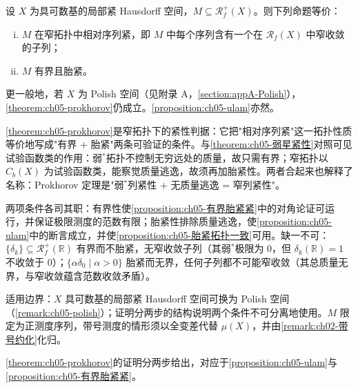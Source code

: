 \documentclass[../../main.tex]{subfiles}%
\begin{document}
\begin{theorem}[Prokhorov]\label{theorem:ch05-prokhorov}
设 $X$ 为具可数基的局部紧 Hausdorff 空间，$M\subseteq\mathscr{R}^+_f(X)$。则下列命题等价：
\begin{enumerate}[(i)]
\item\label{item:ch05-prokth-i} $M$ 在窄拓扑中相对序列紧，即 $M$ 中每个序列含有一个在 $\mathscr{R}_f(X)$ 中窄收敛的子列；
\item\label{item:ch05-prokth-ii} $M$ 有界且胎紧。
\end{enumerate}
\end{theorem}

\begin{remark}\label{remark:ch05-polish}
更一般地，若 $X$ 为 Polish 空间（见附录 A，\cref{section:appA-Polish}），\cref{theorem:ch05-prokhorov}仍成立。\cref{proposition:ch05-ulam}亦然。
\end{remark}

\begin{remark}\label{remark:ch05-prokhorov动机}
\cref{theorem:ch05-prokhorov}是窄拓扑下的紧性判据：它把"相对序列紧"这一拓扑性质等价地写成"有界 + 胎紧"两条可验证的条件。与\cref{theorem:ch05-弱星紧性}对照可见试验函数类的作用：弱$^*$拓扑不控制无穷远处的质量，故只需有界；窄拓扑以 $C_b(X)$ 为试验函数类，能察觉质量逃逸，故须再加胎紧性。两者合起来也解释了名称：Prokhorov 定理是"弱$^*$列紧性 + 无质量逃逸 = 窄列紧性"。

两项条件各司其职：有界性使\cref{proposition:ch05-有界胎紧紧}中的对角论证可运行，并保证极限测度的范数有限；胎紧性排除质量逃逸，使\cref{proposition:ch05-ulam}中的断言成立，并使\cref{proposition:ch05-胎紧拓扑一致}可用。缺一不可：$\{\delta_k\}\subseteq\mathscr{R}^+_f(\mathbb{R})$ 有界而不胎紧，无窄收敛子列（其弱$^*$极限为 $0$，但 $\delta_k(\mathbb{R})=1$ 不收敛于 $0$）；$\{\alpha\delta_0\mid\alpha>0\}$ 胎紧而无界，任何子列都不可能窄收敛（其总质量无界，与窄收敛蕴含范数收敛矛盾）。

适用边界：$X$ 具可数基的局部紧 Hausdorff 空间可换为 Polish 空间（\cref{remark:ch05-polish}）；证明分两步的结构说明两个条件不可分离地使用。$M$ 限定为正测度序列，带号测度的情形须以全变差代替 $\mu(X)$，并由\cref{remark:ch02-带号约化}化归。
\end{remark}

\cref{theorem:ch05-prokhorov}的证明分两步给出，对应于\cref{proposition:ch05-ulam}与\cref{proposition:ch05-有界胎紧紧}。
\end{document}
